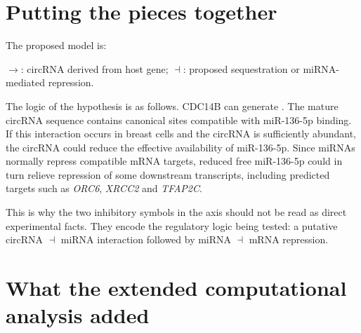\documentclass[11pt]{article}
\newcommand{\mir}[1]{\textit{#1}}
\newcommand{\gene}[1]{\textit{#1}}
\newcommand{\circrna}[1]{\texttt{\detokenize{#1}}}
\begin{document}
\section{Putting the pieces together}

The proposed model is:

\begin{tcolorbox}[colback=softgreen,colframe=darkgreen,boxrule=0.9pt,arc=2mm]
\centering
{}

\vspace{0.55em}
\small $\rightarrow$: circRNA derived from host gene; $\dashv$: proposed sequestration or miRNA-mediated repression.
\end{tcolorbox}

The logic of the hypothesis is as follows. CDC14B can generate \circrna{hsa_circ_0087640}. The mature circRNA sequence contains canonical sites compatible with miR-136-5p binding. If this interaction occurs in breast cells and the circRNA is sufficiently abundant, the circRNA could reduce the effective availability of miR-136-5p. Since miRNAs normally repress compatible mRNA targets, reduced free miR-136-5p could in turn relieve repression of some downstream transcripts, including predicted targets such as \gene{ORC6}, \gene{XRCC2} and \gene{TFAP2C}.

This is why the two inhibitory symbols in the axis should not be read as direct experimental facts. They encode the regulatory logic being tested: a putative circRNA $\dashv$ miRNA interaction followed by miRNA $\dashv$ mRNA repression.

\section{What the extended computational analysis added}
\end{document}
